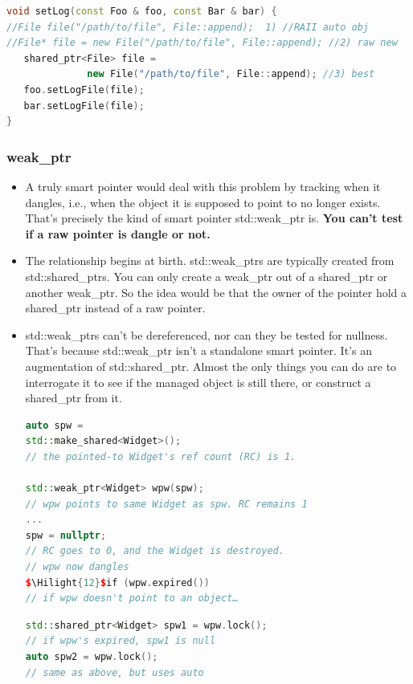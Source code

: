 \documentclass[a4paper,12pt,twoside]{book}
\newcommand{\Hilight}[1]{\makebox[0pt][l]{\color{yellow}\rule[-3pt]{#1em}{11pt}}}
\begin{document}
\begin{itemize}
\begin{lstlisting}[frame=single, language=c++]
void setLog(const Foo & foo, const Bar & bar) {
//File file("/path/to/file", File::append);  1) //RAII auto obj
//File* file = new File("/path/to/file", File::append); //2) raw new
   shared_ptr<File> file =
              new File("/path/to/file", File::append); //3) best
   foo.setLogFile(file);
   bar.setLogFile(file);
}
\end{lstlisting}

\end{itemize}


\subsubsection{weak\_ptr}
\begin{itemize}
\item A truly smart pointer would deal with this problem by tracking
when it dangles, i.e., when the object it is supposed to point to no longer exists. That's
precisely the kind of smart pointer std::weak\_ptr is. \textbf{You can't test if a raw pointer is dangle or not.}

\item The relationship begins at birth. std::weak\_ptrs are typically created from std::shared\_ptrs. You can only create a weak\_ptr out of a shared\_ptr or another weak\_ptr. So the idea would be that the owner of the pointer hold a shared\_ptr instead of a raw pointer.

\item std::weak\_ptrs can't be dereferenced, nor can they be tested for nullness. That's because std::weak\_ptr isn't a standalone smart pointer. It's an augmentation of std::shared\_ptr. Almost the only things you can do are to interrogate it to see if the managed object is still there, or construct a shared\_ptr from it.

\begin{lstlisting}[frame=single, language=c++,mathescape=true]
auto spw =
std::make_shared<Widget>();
// the pointed-to Widget's ref count (RC) is 1.

std::weak_ptr<Widget> wpw(spw);
// wpw points to same Widget as spw. RC remains 1
...
spw = nullptr;
// RC goes to 0, and the Widget is destroyed.
// wpw now dangles
$\Hilight{12}$if (wpw.expired())
// if wpw doesn't point to an object…
\end{lstlisting}

\begin{lstlisting}[frame=single, language=c++,mathescape=true]
std::shared_ptr<Widget> spw1 = wpw.lock();
// if wpw's expired, spw1 is null
auto spw2 = wpw.lock();
// same as above, but uses auto


\end{lstlisting}
\end{itemize}
\end{document}
